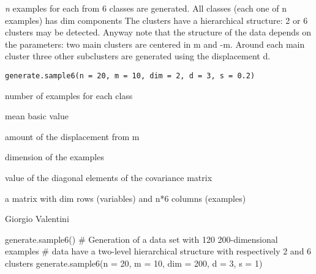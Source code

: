 \documentclass{article}
\begin{document}
\begin{Description}\relax
\emph{n} examples for each from 6 classes are generated.
All classes (each one of n examples) has dim components 
The clusters have a hierarchical structure: 2 or 6 clusters may be detected.
Anyway note that the structure of the data depends on the parameters: two main clusters
are centered in m and -m. Around each main cluster three other subclusters are generated using
the displacement d.
\end{Description}
\begin{Usage}
\begin{verbatim}
generate.sample6(n = 20, m = 10, dim = 2, d = 3, s = 0.2)
\end{verbatim}
\end{Usage}
\begin{Arguments}
\begin{ldescription}
\item[\code{n}] number of examples for each class 
\item[\code{m}] mean basic value  
\item[\code{dim}] amount of the displacement from m 
\item[\code{d}] dimension of the examples 
\item[\code{s}] value of the diagonal elements of the covariance matrix 
\end{ldescription}
\end{Arguments}
\begin{Value}
a matrix with dim rows (variables) and n*6 columns (examples)
\end{Value}
\begin{Author}\relax
Giorgio Valentini 
\end{Author}
\begin{Examples}
\begin{ExampleCode}
generate.sample6()
# Generation of a data set with 120 200-dimensional examples
# data have a two-level hierarchical structure with respectively 2 and 6 clusters 
generate.sample6(n = 20, m = 10, dim = 200, d = 3, s = 1)
\end{ExampleCode}
\end{Examples}
\end{document}
